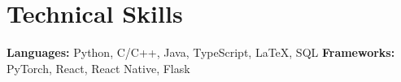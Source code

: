 \documentclass[letterpaper,10pt]{article}
\newcommand{\resumeSubHeadingListStart}{\begin{itemize}[leftmargin=0.15in, label={}]}
\newcommand{\resumeSubHeadingListEnd}{\end{itemize}}
\begin{document}
\section{Technical Skills}
  \resumeSubHeadingListStart
    \small{\item{
    \textbf{Languages:} Python, C/C++, Java, TypeScript, LaTeX, SQL \hspace{10pt}
    \textbf{Frameworks:} PyTorch, React, React Native, Flask
    }}
  \resumeSubHeadingListEnd



\end{document}
